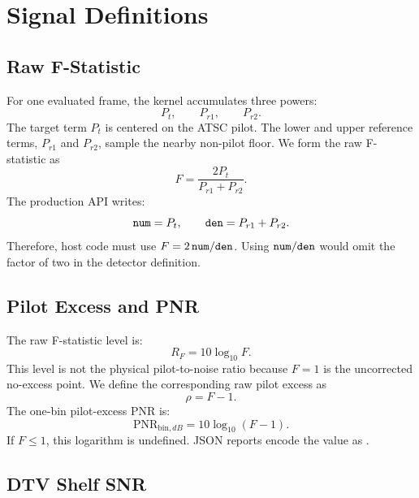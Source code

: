 \documentclass[10pt,letterpaper]{article}
\newcommand{\code}[1]{\texttt{\detokenize{#1}}}
\begin{document}
\section{Signal Definitions}

\subsection{Raw F-Statistic}

For one evaluated frame, the kernel accumulates three powers:
\begin{equation}
  P_t,\qquad P_{r1},\qquad P_{r2}.
\end{equation}
The target term \(P_t\) is centered on the ATSC pilot. The lower and upper reference terms, \(P_{r1}\) and \(P_{r2}\), sample the nearby non-pilot floor. We form the raw F-statistic as
\begin{equation}
  \boxed{F=\frac{2P_t}{P_{r1}+P_{r2}}.}
\end{equation}
The production \code{NumDen} API writes:
\begin{equation}
  \code{num}=P_t,\qquad \code{den}=P_{r1}+P_{r2}.
\end{equation}
Therefore, host code must use \(F=2\,\code{num}/\code{den}\). Using \(\code{num}/\code{den}\) would omit the factor of two in the detector definition.

\subsection{Pilot Excess and PNR}

The raw F-statistic level is:
\begin{equation}
  R_F=10\log_{10}F.
\end{equation}
This level is not the physical pilot-to-noise ratio because \(F=1\) is the uncorrected no-excess point. We define the corresponding raw pilot excess as
\begin{equation}
  \boxed{\rho=F-1.}
\end{equation}
The one-bin pilot-excess PNR is:
\begin{equation}
  \boxed{\mathrm{PNR}_{\mathrm{bin},dB}=10\log_{10}(F-1).}
\end{equation}
If \(F\leq 1\), this logarithm is undefined. JSON reports encode the value as \code{null}.

\subsection{DTV Shelf SNR}
\end{document}
